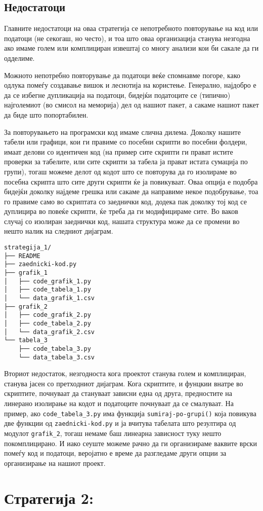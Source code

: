 \documentclass[
]{book}
\begin{document}
\hypertarget{ux43dux435ux434ux43eux441ux442ux430ux442ux43eux446ux438}{%
\subsection{Недостатоци}\label{ux43dux435ux434ux43eux441ux442ux430ux442ux43eux446ux438}}

Главните недостатоци на оваа стратегија се непотребното повторување на код или податоци (не секогаш, но често), и тоа што оваа организација станува незгодна ако имаме голем или комплициран извештај со многу анализи кои би сакале да ги одделиме.

Можното непотребно повторување да податоци веќе спомнавме погоре, како одлука помеѓу создавање вишок и леснотија на користење. Генерално, најдобро е да се избегне дупликација на податоци, бидејќи податоците се (типично) најголемиот (во смисол на меморија) дел од нашиот пакет, а сакаме нашиот пакет да биде што попортабилен.

За повторувањето на програмски код имаме слична дилема. Доколку нашите табели или графици, кои ги правиме со посебни скрипти во посебни фолдери, имаат делови со идентичен код (на пример сите скрипти ги прават истите проверки за табелите, или сите скрипти за табела ја прават истата сумација по групи), тогаш можеме делот од кодот што се повторува да го изолираме во посебна скрипта што сите други скрипти ќе ја повикуваат. Оваа опција е подобра бидејќи доколку најдеме грешка или сакаме да направиме некое подобрување, тоа го правиме само во скриптата со заеднички код, додека пак доколку тој код се дуплицира во повеќе скрипти, ќе треба да ги модифицираме сите. Во ваков случај со изолиран заеднички код, нашата структура може да се промени во нешто налик на следниот дијаграм.

\begin{verbatim}
strategija_1/
├── README
├── zaednicki-kod.py
├── grafik_1
│   ├── code_grafik_1.py
│   ├── code_tabela_1.py
│   └── data_grafik_1.csv
├── grafik_2
│   ├── code_grafik_2.py
│   ├── code_tabela_2.py
│   └── data_grafik_2.csv
└── tabela_3
    ├── code_tabela_3.py
    └── data_tabela_3.csv
\end{verbatim}

Вториот недостаток, незгодноста кога проектот станува голем и комплициран, станува јасен со претходниот дијаграм. Кога скриптите, и фунцкии внатре во скриптите, почнуваат да стануваат зависни една од друга, предностите на линерано изолирање на кодот и податоците почнуваат да се смалуваат. На пример, ако \texttt{code\_tabela\_3.py} има функција \texttt{sumiraj-po-grupi()} која повикува две функции од \texttt{zaednicki-kod.py} и ја вчитува табелата што резултира од модулот \texttt{grafik\_2}, тогаш немаме баш линеарна зависност туку нешто покомплицирано. И иако сеуште можеме рачно да ги организираме ваквите врски помеѓу код и податоци, веројатно е време да разгледаме други опции за организирање на нашиот проект.

\hypertarget{ux441ux442ux440ux430ux442ux435ux433ux438ux458ux430-2}{%
\section{Стратегија 2:}\label{ux441ux442ux440ux430ux442ux435ux433ux438ux458ux430-2}}

  
\end{document}
